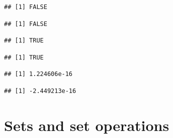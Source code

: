 \documentclass[krantz2]{krantz}\usepackage{knitr}
\begin{document}
\begin{warningbox}
\begin{knitrout}\footnotesize
{}\color{fgcolor}\begin{kframe}
\begin{alltt}
 \hlopt{==}  
\end{alltt}
\begin{verbatim}
## [1] FALSE
\end{verbatim}
\begin{alltt}
\hlstd{(} \hlopt{*}  \hlopt{==} 
\end{alltt}
\begin{verbatim}
## [1] FALSE
\end{verbatim}
\begin{alltt}
\hlstd{(} \hlopt{<} 
\end{alltt}
\begin{verbatim}
## [1] TRUE
\end{verbatim}
\begin{alltt}
\hlstd{(}\hlstd{(} \hlopt{*}  \hlopt{<} 
\end{alltt}
\begin{verbatim}
## [1] TRUE
\end{verbatim}
\begin{alltt}
\end{alltt}
\begin{verbatim}
## [1] 1.224606e-16
\end{verbatim}
\begin{alltt}
\hlstd{(} \hlopt{*} 
\end{alltt}
\begin{verbatim}
## [1] -2.449213e-16
\end{verbatim}
\end{kframe}
\end{knitrout}

\end{warningbox}


\section{Sets and set operations}
\end{document}
